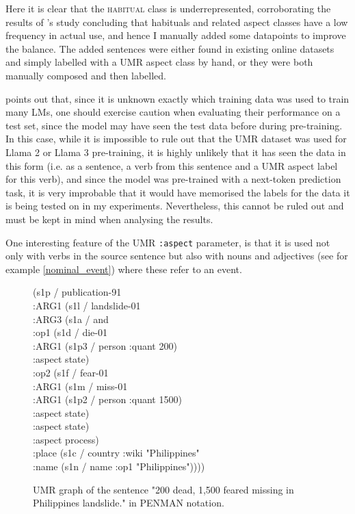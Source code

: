 \label{umr_aspect_data}

Here it is clear that the \textsc{habitual} class is underrepresented, corroborating the results of \citet{Dahl1985TenseAA}'s study concluding that habituals and related aspect classes have a low frequency in actual use, and hence I manually added some datapoints to improve the balance. The added sentences were either found in existing online datasets and simply labelled with a UMR aspect class by hand, or they were both manually composed and then labelled.

\citet{törnberg2024best} points out that, since it is unknown exactly which training data was used to train many LMs, one should exercise caution when evaluating their performance on a test set, since the model may have seen the test data before during pre-training. In this case, while it is impossible to rule out that the UMR dataset was used for Llama 2 or Llama 3 pre-training, it is highly unlikely that it has seen the data in this form (i.e. as a sentence, a verb from this sentence and a UMR aspect label for this verb), and since the model was pre-trained with a next-token prediction task, it is very improbable that it would have memorised the labels for the data it is being tested on in my experiments. Nevertheless, this cannot be ruled out and must be kept in mind when analysing the results.

One interesting feature of the UMR \texttt{:aspect} parameter, is that it is used not only with verbs in the source sentence but also with nouns and adjectives (see for example \ref{nominal_event}) where these refer to an event.

\begin{figure}[t]
    (s1p / publication-91 \\
    \null\quad :ARG1 (s1l / landslide-01 \\
    \null\quad \quad:ARG3 (s1a / and \\
    \null\quad \quad\quad:op1 (s1d / die-01 \\
    \null\quad \quad\quad\quad:ARG1 (s1p3 / person :quant 200) \\
    \null\quad \quad\quad\quad:aspect state) \\
    \null\quad \quad\quad:op2 (s1f / fear-01 \\
    \null\quad \quad\quad\quad:ARG1 (s1m / miss-01 \\
    \null\quad \quad\quad\quad\quad:ARG1 (s1p2 / person :quant 1500) \\
    \null\quad \quad\quad\quad\quad:aspect state) \\
    \null\quad \quad\quad\quad:aspect state) \\
    \null\quad \quad\quad:aspect process) \\
    \null\quad :place (s1c / country :wiki "Philippines"  \\
    \null\quad \quad:name (s1n / name :op1 "Philippines"))))
    \caption{UMR graph of the sentence "200 dead, 1,500 feared missing in Philippines landslide." in PENMAN notation.}
\end{figure}
\label{nominal_event}

